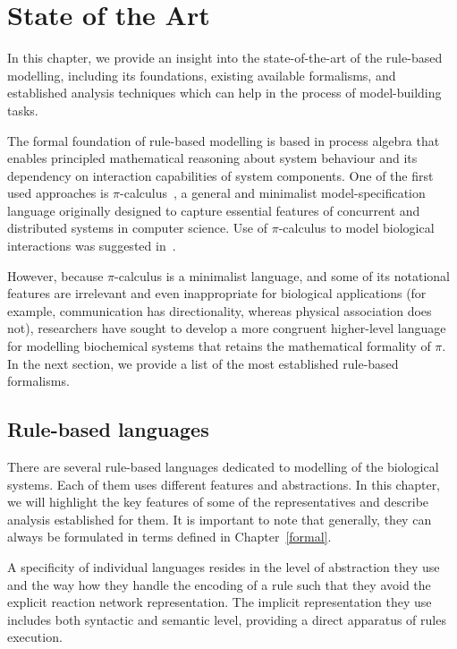 \documentclass[11pt,a4paper]{report}
\begin{document}
\chapter{State of the Art} \label{chap:state}

In this chapter, we provide an insight into the state-of-the-art of the rule-based modelling, including its foundations, existing available formalisms, and established analysis techniques which can help in the process of model-building tasks.

The formal foundation of rule-based modelling is based in process algebra that enables principled mathematical reasoning about system behaviour and its dependency on interaction capabilities of system components. One of the first used approaches is $\pi$-calculus~\cite{milner1999communicating}, a general and minimalist model-specification language originally designed to capture essential features of concurrent and distributed systems in computer science. Use of $\pi$-calculus to model biological interactions was suggested in~\cite{regev2000representation}.

However, because $\pi$-calculus is a minimalist language, and some of its notational features are irrelevant and even inappropriate for biological applications (for example, communication has directionality, whereas physical association does not), researchers have sought to develop a more congruent higher-level language for
modelling biochemical systems that retains the mathematical formality of $\pi$. In the next section, we provide a list of the most established rule-based formalisms.

\section{Rule-based languages}
\label{rule_based_languages}

There are several rule-based languages dedicated to modelling of the biological systems. Each of them uses different features and abstractions. In this chapter, we will highlight the key features of some of the representatives and describe analysis established for them. It is important to note that generally, they can always be formulated in terms defined in Chapter~\ref{formal}.

A specificity of individual languages resides in the level of abstraction they use and the way how they handle the encoding of a rule such that they avoid the explicit reaction network representation. The implicit representation they use includes both syntactic and semantic level, providing a direct apparatus of rules execution.
\end{document}
